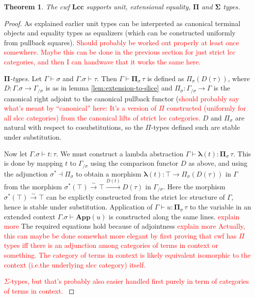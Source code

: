 \documentclass{article}
\newcommand{\todo}[1]{\textcolor{red}{#1}}
\newtheorem{theorem}{Theorem}
\theoremstyle{remark}
\theoremstyle{definition}
\begin{document}
\begin{theorem}
  \label{th:lcc-supports-types}
  The cwf $\mathbf{Lcc}$ supports unit, extensional equality, $\mathbf{\Pi}$ and $\mathbf{\Sigma}$ types.
\end{theorem}
\begin{proof}
  As explained earlier unit types can be interpreted as canonical terminal objects and equality types as equalizers (which can be constructed uniformly from pullback squares).
  \todo{
    Should probably be worked out properly at least once somewhere.
    Maybe this can be done in the previous section for just strict lcc categories, and then I can handwave that it works the same here.
  }

  \emph{$\mathbf{\Pi}$-types.}
  Let $\Gamma \vdash \sigma$ and $\Gamma.\sigma \vdash \tau$.
  Then $\Gamma \vdash \mathbf{\Pi}_\sigma \, \tau$ is defined as $\Pi_\sigma(D(\tau))$, where $D : \Gamma.\sigma \rightarrow \Gamma_{/ \sigma}$ is as in lemma \ref{lem:extension-to-slice} and $\Pi_\sigma : \Gamma_{/ \sigma} \rightarrow \Gamma$ is the canonical right adjoint to the canonical pullback functor (\todo{should probably say what's meant by ``canonical'' here: It's a version of $\Pi$ constructed (uniformly for all slcc categories) from the canonical lifts of strict lcc categories.}
  $D$ and $\Pi_\sigma$ are natural with respect to cosubstitutions, so the $\Pi$-types defined such are stable under substitution.

  Now let $\Gamma.\sigma \vdash t : \tau$.
  We must construct a lambda abstraction $\Gamma \vdash \mathbf{\lambda}(t) : \mathbf{\Pi}_\sigma \, \tau$.
  This is done by mapping $t$ to $\Gamma_{/ \sigma}$ using the comparison functor $D$ as above, and using the adjunction $\sigma^* \dashv \Pi_\sigma$ to obtain a morphism $\mathbf{\lambda}(t) : \top \rightarrow \Pi_\sigma(D(\tau))$ in $\Gamma$ from the morphism $\sigma^*(\top) \xrightarrow{\sim} \top \xrightarrow{D(t)} D(\tau)$ in $\Gamma_{/ \sigma}$.
  Here the morphism $\sigma^*(\top) \xrightarrow{\sim} \top$ can be explictly constructed from the strict lcc structure of $\Gamma$, hence is stable under substitution.
  Application of $\Gamma \vdash u : \mathbf{\Pi}_\sigma \, \tau$ to the variable in an extended context $\Gamma.\sigma \vdash \mathbf{App}(u)$ is constructed along the same lines. \todo{explain more}
  The required equations hold because of adjointness \todo{explain more}
  \todo{
    Actually, this can maybe be done somewhat more elegant by first proving that cwf has $\Pi$ types iff there is an adjunction among categories of terms in context or something.
    The category of terms in context is likely equivalent isomorphic to the context (i.e.\@ the underlying slcc category) itself.
  }

  \todo{
    $\Sigma$-types, but that's probably also easier handled first purely in term of categories of terms in context.
  }
\end{proof}
\end{document}
